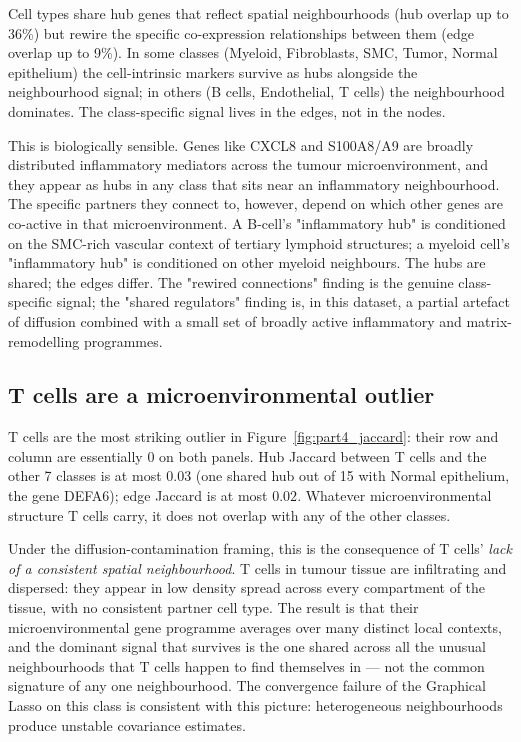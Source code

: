 \begin{insight}
Cell types share hub genes that reflect spatial neighbourhoods (hub overlap up to 36\%) but rewire the specific co-expression relationships between them (edge overlap up to 9\%). In some classes (Myeloid, Fibroblasts, SMC, Tumor, Normal epithelium) the cell-intrinsic markers survive as hubs alongside the neighbourhood signal; in others (B cells, Endothelial, T cells) the neighbourhood dominates. The class-specific signal lives in the edges, not in the nodes.
\end{insight}

This is biologically sensible. Genes like CXCL8 and S100A8/A9 are broadly distributed inflammatory mediators across the tumour microenvironment, and they appear as hubs in any class that sits near an inflammatory neighbourhood. The specific partners they connect to, however, depend on which other genes are co-active in that microenvironment. A B-cell's "inflammatory hub" is conditioned on the SMC-rich vascular context of tertiary lymphoid structures; a myeloid cell's "inflammatory hub" is conditioned on other myeloid neighbours. The hubs are shared; the edges differ. The "rewired connections" finding is the genuine class-specific signal; the "shared regulators" finding is, in this dataset, a partial artefact of diffusion combined with a small set of broadly active inflammatory and matrix-remodelling programmes.

\subsection*{T cells are a microenvironmental outlier}

T cells are the most striking outlier in Figure~\ref{fig:part4_jaccard}: their row and column are essentially 0 on both panels. Hub Jaccard between T cells and the other 7 classes is at most $0.03$ (one shared hub out of 15 with Normal epithelium, the gene DEFA6); edge Jaccard is at most $0.02$. Whatever microenvironmental structure T cells carry, it does not overlap with any of the other classes.

Under the diffusion-contamination framing, this is the consequence of T cells' \emph{lack of a consistent spatial neighbourhood}. T cells in tumour tissue are infiltrating and dispersed: they appear in low density spread across every compartment of the tissue, with no consistent partner cell type. The result is that their microenvironmental gene programme averages over many distinct local contexts, and the dominant signal that survives is the one shared across all the unusual neighbourhoods that T cells happen to find themselves in --- not the common signature of any one neighbourhood. The convergence failure of the Graphical Lasso on this class is consistent with this picture: heterogeneous neighbourhoods produce unstable covariance estimates.

